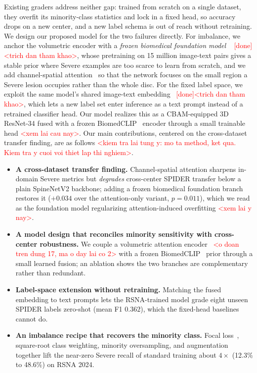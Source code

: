\documentclass[runningheads]{llncs}
\begin{document}
Existing graders address neither gap: trained from scratch on a single dataset, they overfit its minority-class statistics and lock in a fixed head, so accuracy drops on a new center, and a new label schema is out of reach without retraining. We design our proposed model for the two failures directly. For imbalance, we anchor the volumetric encoder with a \emph{frozen biomedical foundation model} ~\cite{zhang2023biomedclip} \textcolor{red}{[done] <trich dan tham khao>}, whose pretraining on 15 million image-text pairs gives a stable prior where Severe examples are too scarce to learn from scratch, and we add channel-spatial attention~\cite{woo2018cbam} so that the network focuses on the small region a Severe lesion occupies rather than the whole disc. For the fixed label space, we exploit the same model's shared image-text embedding~\cite{radford2021clip} \textcolor{red}{[done]<trich dan tham khao>}, which lets a new label set enter inference as a text prompt instead of a retrained classifier head. Our model realizes this as a CBAM-equipped 3D ResNet-34 fused with a frozen BiomedCLIP~\cite{zhang2023biomedclip} encoder through a small trainable head \textcolor{red}{<xem lai cau nay>}. Our main contributions, centered on the cross-dataset transfer finding, are as follows \textcolor{red}{<kiem tra lai tung y: mo ta method, ket qua. Kiem tra y cuoi voi thiet lap thi nghiem>}.
\begin{itemize}
    \item \textbf{A cross-dataset transfer finding.} Channel-spatial attention sharpens in-domain Severe metrics but \emph{degrades} cross-center SPIDER transfer below a plain SpineNetV2 backbone; adding a frozen biomedical foundation branch restores it ($+0.034$ over the attention-only variant, $p=0.011$), which we read as the foundation model regularizing attention-induced overfitting \textcolor{red}{<xem lai y nay>}.
    \item \textbf{A model design that reconciles minority sensitivity with cross-center robustness.} We couple a volumetric attention encoder~\cite{woo2018cbam} \textcolor{red}{<o doan tren dung 17, ma o day lai co 2>} with a frozen BiomedCLIP~\cite{zhang2023biomedclip} prior through a small learned fusion; an ablation shows the two branches are complementary rather than redundant.
    \item \textbf{Label-space extension without retraining.} Matching the fused embedding to text prompts lets the RSNA-trained model grade eight unseen SPIDER labels zero-shot (mean F1 $0.362$), which the fixed-head baselines cannot do.
    \item \textbf{An imbalance recipe that recovers the minority class.} Focal loss~\cite{lin2017focal}, square-root class weighting, minority oversampling, and augmentation together lift the near-zero Severe recall of standard training about $4\times$ (12.3\% to 48.6\%) on RSNA 2024.
\end{itemize}
\end{document}

